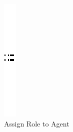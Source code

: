 \vspace{1cm}
\begin{figure}[th]
\centering
		\quad{}
		\includegraphics{ch3/img/sep}
		\quad{}
\caption{\label{fig:Create link between Agent and Role}Assign Role to Agent } 
\end{figure}
 

